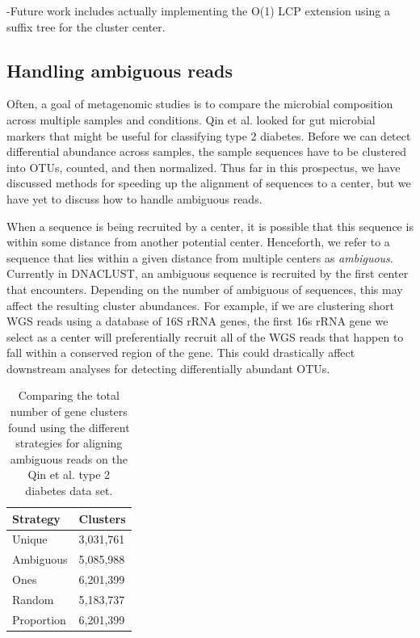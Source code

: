 -Future work includes actually implementing the O(1) LCP extension using a suffix tree for the cluster center.


\subsection{Handling ambiguous reads}

Often, a goal of metagenomic studies is to compare the microbial composition across multiple samples and conditions.
Qin et al. looked for gut microbial markers that might be useful for classifying type 2 diabetes\cite{qin_metagenome-wide_2012}.
Before we can detect differential abundance across samples, the sample sequences have to be clustered into OTUs, counted, and then normalized\cite{paulson_differential_2013}.
Thus far in this prospectus, we have discussed methods for speeding up the alignment of sequences to a center, but we have yet to discuss how to handle ambiguous reads.

When a sequence is being recruited by a center, it is possible that this sequence is within some distance from another potential center.
Henceforth, we refer to a sequence that lies within a given distance from multiple centers as \emph{ambiguous}.
Currently in DNACLUST, an ambiguous sequence is recruited by the first center that encounters.
Depending on the number of ambiguous of sequences, this may affect the resulting cluster abundances.
For example, if we are clustering short WGS reads using a database of 16S rRNA genes, the first 16s rRNA gene we select as a center will preferentially recruit all of the WGS reads that happen to fall within a conserved region of the gene.
This could drastically affect downstream analyses for detecting differentially abundant OTUs.

\begin{table}[t]
\centering
\begin{tabular}{@{}ll@{}}
\toprule
Strategy   & Clusters  \\ \midrule
Unique     & 3,031,761 \\
Ambiguous  & 5,085,988 \\
Ones       & 6,201,399 \\
Random     & 5,183,737 \\
Proportion & 6,201,399 \\ \bottomrule
\end{tabular}
\caption{Comparing the total number of gene clusters found using the different strategies for aligning ambiguous reads on the Qin et al. type 2 diabetes data set.}
\label{table:ambiguous_reads}
\end{table}

